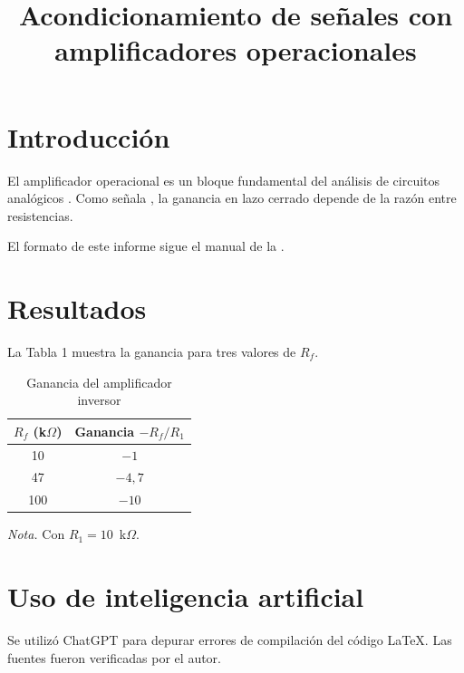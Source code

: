 \documentclass[stu,12pt,a4paper,floatsintext]{apa7}
\title{Acondicionamiento de señales con amplificadores operacionales}
\begin{document}
\maketitle

\section{Introducción}
El amplificador operacional es un bloque fundamental del análisis de circuitos
analógicos \cite{sedra2020}.   %
 Como señala \parencite{boylestad2023}   %
, la ganancia
en lazo cerrado depende de la razón entre resistencias.

El formato de este informe sigue el manual de la \textcite{apa2020}.

\section{Resultados}
La Tabla 1 muestra   %
 la ganancia para tres valores de $R_f$.

\begin{table}[htbp]
  \caption{Ganancia del amplificador inversor}
  \label{tab:ganancia}
  \centering
  \begin{threeparttable}
  \begin{tabular}{|c|c|}   %
    \hline
    $R_f$ (k$\Omega$) & Ganancia $-R_f/R_1$ \\
    \hline
    10 & $-1$ \\
    47 & $-4{,}7$ \\
    100 & $-10$ \\
    \hline
  \end{tabular}
  \begin{tablenotes}[para]
    \item \textit{Nota.} Con $R_1 = 10$~k$\Omega$.
  \end{tablenotes}
  \end{threeparttable}
\end{table}

\section{Uso de inteligencia artificial}
Se utilizó ChatGPT para   %
 depurar errores de compilación
del código \LaTeX. Las fuentes fueron verificadas por el autor.

\printbibliography[title={Referencias}]
\end{document}
